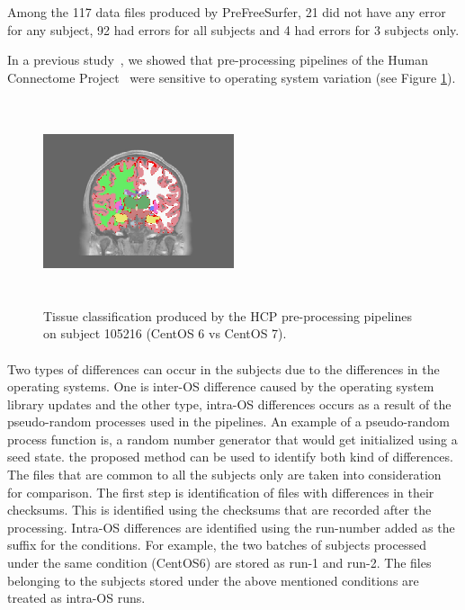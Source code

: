 \documentclass{article}
\begin{document}
Among the 117 data files produced by PreFreeSurfer, 21 did not have any error for any subject, 92 had errors 
for all subjects and 4 had errors for 3 subjects only. 

In a previous study~\cite{Scaria2017}, we showed that
pre-processing pipelines of the Human Connectome
Project~\cite{Glasser2013} were sensitive to operating system
variation (see Figure \ref{fig:1}).
\begin{figure}
  \includegraphics[width=0.5\textwidth, height=6cm]{images/brain_classification.png}
  \caption{Tissue classification produced by the HCP pre-processing
    pipelines on subject 105216 (CentOS 6 vs CentOS 7).}
  \label{fig:1}
\end{figure}

\paragraph{}
Two types of differences can occur in the subjects due to the differences in the operating systems. 
One is inter-OS difference caused by the operating system library updates and the other type,
 intra-OS differences occurs as a result of the pseudo-random processes used in the pipelines.
 An example of a pseudo-random process function is, a random number generator that would get initialized 
using a seed state. the proposed method can be used to identify both kind of differences. 
The files that are common to all the subjects only are taken into consideration for comparison. The first step
 is identification of files with differences in their checksums. This is identified using the checksums that are
 recorded after the processing. Intra-OS differences are identified using the run-number added as the suffix for
 the conditions. For example, the two batches of subjects processed under the same condition (CentOS6) are stored 
as run-1 and run-2. The files belonging to the subjects stored under the above mentioned conditions are treated as intra-OS runs.
\end{document}
